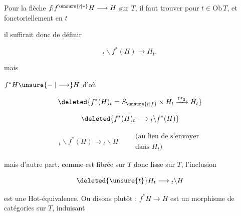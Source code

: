 
Pour la flèche $f_! f^{\unsure{\prime|*}}H\longrightarrow H$ sur $T$, il faut trouver pour  $t\in\mathrm{Ob}\,T$, et fonctoriellement en $t$


il suffirait donc de définir

\[
{}_{t}\backslash f^*(H)\longrightarrow H_t,
\]

mais 


 $f^*H\unsure{\mathrel{-}|\longrightarrow}H$ d'où

\[
\deleted{f^*(H)_t=S_{\unsure{t|f}}\times H_t\xrightarrow{\mathrm{pr}_2}H_t}
\]


\[
\deleted{f^*(H)_t\longrightarrow {}_{t}\backslash f^*(H)}
\]

\[
{}_{t}\backslash f^*(H)\longrightarrow {}_{t}\backslash H
\qquad\substack{\text{(au lieu de s'envoyer}\\\text{dans }H_t\text{)}}
\]

mais d'autre part, comme  est fibrée sur $T$ donc lisse sur $T$, l'inclusion

\[
\deleted{\unsure{t}}H_t\longrightarrow {}_{t}\backslash H
\]

est une Hot-équivalence. Ou disons plutôt : $f^*H\longrightarrow H$ est un morphisme de catégories sur $T$, induisant


